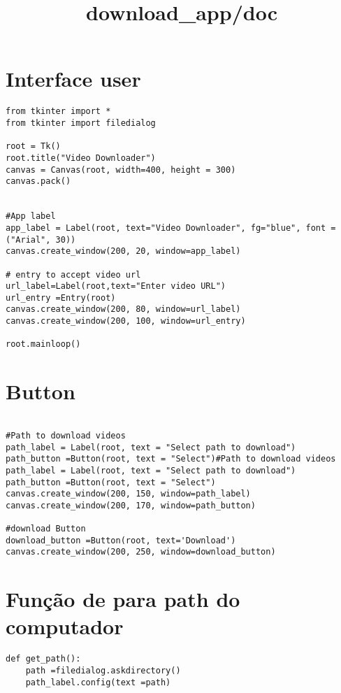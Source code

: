 \documentclass[letterpaper]{article}
\date{} %
\title{\textbf{download_app/doc}}
\begin{document}
\maketitle

\section{Interface user}
\begin{lstlisting}[style=pythonStyle, title= Interface do usuario ] 
from tkinter import *
from tkinter import filedialog

root = Tk()
root.title("Video Downloader")
canvas = Canvas(root, width=400, height = 300)
canvas.pack()


#App label
app_label = Label(root, text="Video Downloader", fg="blue", font =("Arial", 30))
canvas.create_window(200, 20, window=app_label)

# entry to accept video url
url_label=Label(root,text="Enter video URL")
url_entry =Entry(root)
canvas.create_window(200, 80, window=url_label)
canvas.create_window(200, 100, window=url_entry)

root.mainloop()
\end{lstlisting}
\section{Button}
\begin{lstlisting}[style=pythonStyle, title=line 20 for 28 ]

#Path to download videos
path_label = Label(root, text = "Select path to download")
path_button =Button(root, text = "Select")#Path to download videos
path_label = Label(root, text = "Select path to download")
path_button =Button(root, text = "Select")
canvas.create_window(200, 150, window=path_label)
canvas.create_window(200, 170, window=path_button)

#download Button
download_button =Button(root, text='Download')
canvas.create_window(200, 250, window=download_button)
\end{lstlisting}

\section{Função de para path do computador}
\begin{lstlisting}[style=pythonStyle, title=linha 15 a 17 ] 
    def get_path():
    path =filedialog.askdirectory()
    path_label.config(text =path)
\end{lstlisting}
\end{document}
